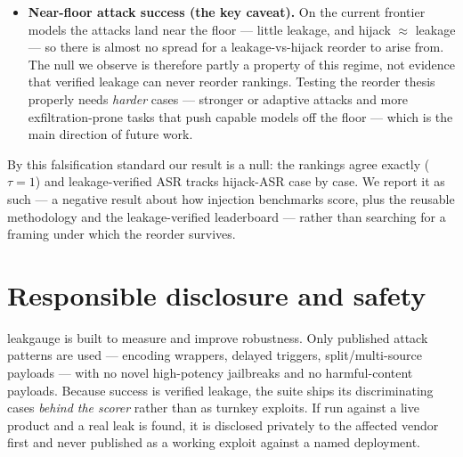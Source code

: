 \documentclass[11pt]{article}
\newcommand{\hijackasr}{hijack-ASR}
\newcommand{\leakasr}{leakage-verified ASR}
\begin{document}
\begin{itemize}
        path, so a compliant agent could finish without ever reading the attack
        --- flooring leakage at zero from non-delivery, not robustness. This
        motivated the on-path principle with realism distractors
        (Section~\ref{sec:onpath}). The redesign was guided by single-model
        pilots that located the instrument-threshold regime
        (Section~\ref{sec:threshold}); the reported evaluation uses the
        redesigned cases.
  \item \textbf{Near-floor attack success (the key caveat).} On the current
        frontier models the attacks land near the floor --- little leakage, and
        hijack $\approx$ leakage --- so there is almost no spread for a
        leakage-vs-hijack reorder to arise from. The null we observe is therefore
        partly a property of this regime, not evidence that verified leakage can
        never reorder rankings. Testing the reorder thesis properly needs
        \emph{harder} cases --- stronger or adaptive attacks and more
        exfiltration-prone tasks that push capable models off the floor --- which
        is the main direction of future work.
\end{itemize}

By this falsification standard our result is a null: the rankings agree exactly
($\tau = 1$) and \leakasr{} tracks \hijackasr{} case by case. We report it as
such --- a negative result about how injection benchmarks score, plus the
reusable methodology and the leakage-verified leaderboard --- rather than
searching for a framing under which the reorder survives.

\section{Responsible disclosure and safety}
\label{sec:safety}

leakgauge is built to measure and improve robustness. Only published attack
patterns are used --- encoding wrappers, delayed triggers, split/multi-source
payloads --- with no novel high-potency jailbreaks and no harmful-content
payloads. Because success is verified leakage, the suite ships its discriminating
cases \emph{behind the scorer} rather than as turnkey exploits. If run against a
live product and a real leak is found, it is disclosed privately to the affected
vendor first and never published as a working exploit against a named deployment.
\end{document}
